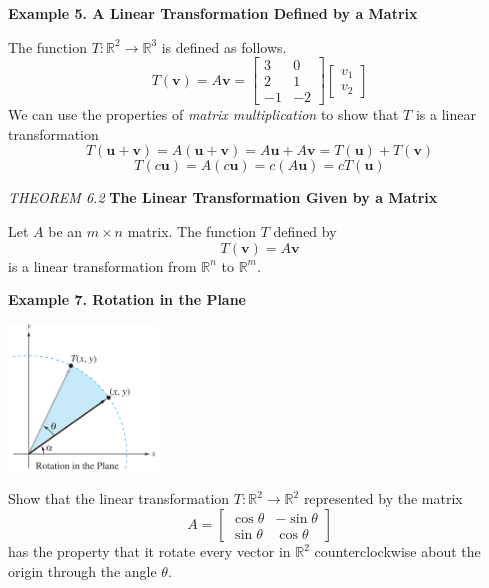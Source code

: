 \documentclass{article}
\newcommand\B{\textbf}
\newcommand\x{\times}
\newcommand\R{\mathbb{R}}
\newcounter{Def}[section]
\begin{document}
    \textbf{Example 5. \textcolor{blue5}{A Linear Transformation Defined by a Matrix}} 

    The function $T: \R^2 \to \R^3$ is defined as follows.
    \[T(\B{v}) = A\B{v} = 
        \begin{bmatrix}
            3 & 0 \\
            2 & 1 \\
            -1 & -2
        \end{bmatrix}
        \begin{bmatrix}
            v_1 \\
            v_2
        \end{bmatrix}\]
    We can use the properties of \textit{matrix multiplication} to show that $T$ is a linear transformation
    \[T(\B{u} + \B{v}) = A(\B{u} + \B{v}) = A\B{u} + A\B{v} = T(\B{u}) + T(\B{v})\]
    \[T(c\B{u}) = A(c\B{u}) = c(A\B{u}) = cT(\B{u})\]
    \begin{tcolorbox}[colback = {blue9}]
        \textit{THEOREM 6.2} \textbf{The Linear Transformation Given by a Matrix}

        Let $A$ be an $m \x n$ matrix. The function $T$ defined by
        \[T(\B{v}) = A\B{v}\]
        is a linear transformation from $\R^n$ to $\R^m$.
    \end{tcolorbox}
    
    \textbf{Example 7. \textcolor{blue5}{Rotation in the Plane}}

    \begin{minipage}{0.3\linewidth}
        \includegraphics[width = 4cm]{images/rotate2d.png}
    \end{minipage}
    \begin{minipage}{0.6\linewidth}
            Show that the linear transformation $T: \R^2 \to \R^2$ represented by the matrix
            \[A = \begin{bmatrix}
        \cos{\theta} & -\sin{\theta} \\
        \sin{\theta} & \cos{\theta}
    \end{bmatrix}\]
    has the property that it rotate every vector in $\R^2$ counterclockwise about the origin through the angle $\theta$.

    \end{minipage}
    
\end{document}
